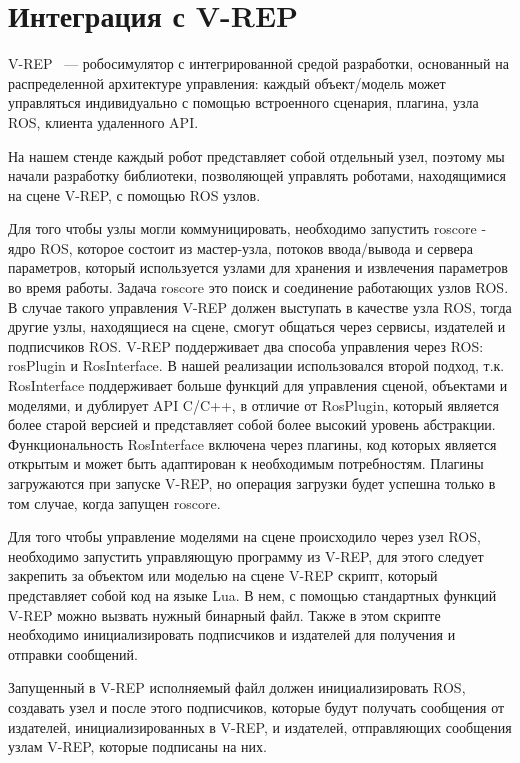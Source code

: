 \documentclass{spisok-article}
\begin{document}
\section{Интеграция с V-REP}

V-REP~\cite{vrep2013} --- робосимулятор с интегрированной средой разработки, основанный на распределенной архитектуре управления: каждый объект/модель может управляться индивидуально с помощью встроенного сценария, плагина, узла ROS, клиента удаленного API.

На нашем стенде каждый робот представляет собой отдельный узел, поэтому мы начали разработку библиотеки, позволяющей управлять роботами, находящимися на сцене V-REP, с помощью ROS узлов.

Для того чтобы узлы могли коммуницировать, необходимо запустить roscore - ядро ROS, которое состоит из мастер-узла, потоков ввода/вывода и сервера параметров, который используется узлами для хранения и извлечения параметров во время работы. Задача roscore это поиск и соединение работающих узлов ROS. В случае такого управления V-REP должен выступать в качестве узла ROS, тогда  другие узлы, находящиеся на сцене, смогут общаться через сервисы, издателей и подписчиков ROS. V-REP поддерживает два способа управления через ROS:  rosPlugin и RosInterface. В нашей реализации использовался второй подход, т.к. RosInterface поддерживает больше функций для управления сценой, объектами и моделями, и дублирует API C/C++, в отличие от RosPlugin, который является более старой версией и представляет собой более высокий уровень абстракции. Функциональность RosInterface включена через плагины, код которых является открытым и может быть адаптирован к необходимым потребностям. Плагины загружаются при запуске V-REP, но операция загрузки будет успешна  только в том случае, когда запущен roscore.

Для того чтобы управление моделями на сцене происходило через узел ROS, необходимо запустить управляющую программу из V-REP, для этого следует закрепить за объектом или моделью на сцене V-REP скрипт, который представляет собой код на языке Lua. В нем, с помощью стандартных функций V-REP можно вызвать нужный бинарный файл.  Также в этом скрипте необходимо инициализировать подписчиков и издателей для получения и отправки сообщений.

Запущенный в V-REP исполняемый файл должен инициализировать ROS, создавать узел и после этого подписчиков, которые будут получать сообщения от издателей, инициализированных в V-REP, и издателей, отправляющих сообщения узлам V-REP, которые подписаны на них.
\end{document}
